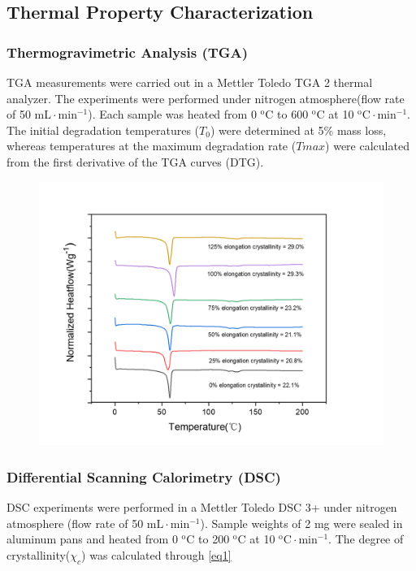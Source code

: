 \documentclass{article}%
\begin{document}
  \subsection{Thermal Property Characterization} %
  \label{sub:thermal_property_characterization}
    \subsubsection{Thermogravimetric Analysis (TGA)}
    TGA measurements were carried out in a Mettler Toledo TGA 2 thermal analyzer. 
    The experiments were performed under nitrogen atmosphere(flow rate of 50 $\mathrm{mL\cdot min^{-1}}$). 
    Each sample was heated from 0 $\mathrm{^o C}$ to 600 $\mathrm{^o C}$ at 10 $\mathrm{^o C\cdot min^{-1}}$.
    The initial degradation temperatures ($T_0$) were determined at 5\% mass loss, whereas temperatures at the maximum degradation rate ($Tmax$) were calculated from the first derivative of the TGA curves (DTG).
    \begin{figure}
      \includegraphics[scale=0.4]{figures/DSC_result_1.png}
    \end{figure}

    \subsubsection{Differential Scanning Calorimetry (DSC)}
    DSC experiments were performed in a Mettler Toledo DSC 3+ under nitrogen atmosphere (flow rate of 50 $\mathrm{mL\cdot min^{-1}}$). 
    Sample weights of 2 mg were sealed in aluminum pans and heated from 0 $\mathrm{^o C}$ to 200 $\mathrm{^o C}$ at 10 $\mathrm{^o C\cdot min^{-1}}$. 
    The degree of crystallinity($\chi_{c}$) was calculated through \autoref{eq1}
    
\end{document}
